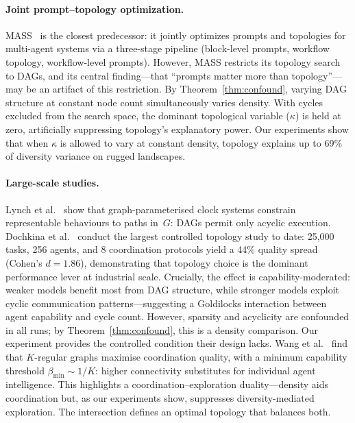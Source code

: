 \documentclass{llncs}
\begin{document}
\paragraph{Joint prompt--topology optimization.}
MASS~\cite{zhou2025mass} is the closest predecessor: it jointly optimizes
prompts and topologies for multi-agent systems via a three-stage pipeline
(block-level prompts, workflow topology, workflow-level prompts). However,
MASS restricts its topology search to DAGs, and its central finding---that
``prompts matter more than topology''---may be an artifact of this
restriction. By Theorem~\ref{thm:confound}, varying DAG structure at
constant node count simultaneously varies density. With cycles excluded from
the search space, the dominant topological variable ($\kappa$) is held at
zero, artificially suppressing topology's explanatory power. Our experiments
show that when $\kappa$ is allowed to vary at constant density, topology
explains up to 69\% of diversity variance on rugged landscapes.

\paragraph{Large-scale studies.}
Lynch et al.~\cite{clocksystems2026} show that graph-parameterised
clock systems constrain representable behaviours to paths in~$G$: DAGs
permit only acyclic execution. Dochkina et al.~\cite{dochkina2026}
conduct the largest controlled topology study to date: 25,000 tasks,
256 agents, and 8 coordination protocols yield a 44\% quality spread
(Cohen's $d = 1.86$), demonstrating that topology choice is the
dominant performance lever at industrial scale. Crucially, the effect
is capability-moderated: weaker models benefit most from DAG
structure, while stronger models exploit cyclic communication
patterns---suggesting a Goldilocks interaction between agent
capability and cycle count. However, sparsity and
acyclicity are confounded in all runs; by Theorem~\ref{thm:confound},
this is a density comparison. Our experiment provides the controlled
condition their design lacks.
Wang et al.~\cite{wang2026kregular} find that $K$-regular graphs
maximise coordination quality, with a minimum capability threshold
$\beta_{\min} \sim 1/K$: higher connectivity substitutes for
individual agent intelligence. This highlights a
coordination--exploration duality---density aids coordination but, as
our experiments show, suppresses diversity-mediated exploration. The
intersection defines an optimal topology that balances both.
\end{document}
